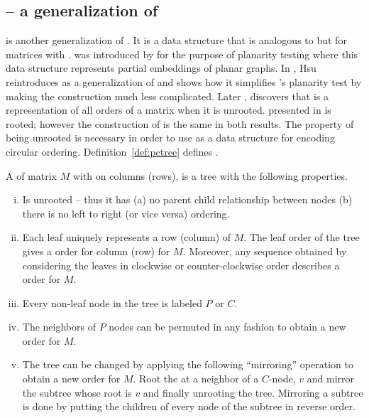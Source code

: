     
\subsection{\PCtree -- a generalization of \PQtree}

\PCtree is another generalization of \PQtree. It is a data structure that is
analogous to \PQtree but for matrices with \crop. \PCtree was
introduced by \cite{sh99} for the purpose of planarity testing where
this data structure represents partial embeddings of planar
graphs. %
In \cite{wlh01}, Hsu reintroduces \PCtree as a generalization of
\PQtree and shows how it simplifies \cite{bl76}'s planarity test by
making the \PQtree construction much less complicated. Later
\cite{hm03}, discovers that \PCtree is a representation of all \crop
orders of a matrix when it is unrooted. \PCtree presented in
\cite{wlh01} is rooted; however the construction of \PCtree is the
same in both results. The property of being unrooted is necessary in
order to use \PCtree as a data structure for encoding circular
ordering. Definition~\ref{def:pctree} defines \PCtree.

\begin{definition}
  \label{def:pctree}
   A \PCtree of matrix $M$ with
  \CROP on columns (rows), is a tree with the following properties.
  \begin{enumerate}[i.]
    \singlespacing
  \item Is unrooted -- thus it has (a) no parent child relationship
    between nodes (b) there is no left to right (or vice versa)
    ordering.
  \item Each leaf uniquely represents a row (column) of $M$. The leaf
    order of the tree gives a \CROP order for column (row) for
    $M$. Moreover, any sequence obtained by considering the leaves in
    clockwise or counter-clockwise order describes a \CROP order for
    $M$.
  \item Every non-leaf node in the tree is labeled $P$ or $C$.
  \item The neighbors of $P$ nodes can be permuted in any fashion to
    obtain a new \CROP order for $M$.
  \item \label{def::pcmirror} The tree can be changed by applying the following
    ``mirroring'' operation to obtain a new \CROP order for $M$. Root
    the \PCtree at a neighbor of a $C$-node, $v$ and mirror the
    subtree whose root is $v$ and finally unrooting the
    tree. Mirroring a subtree is done by putting the children of every
    node of the subtree in reverse order.
  \end{enumerate}
\end{definition}

